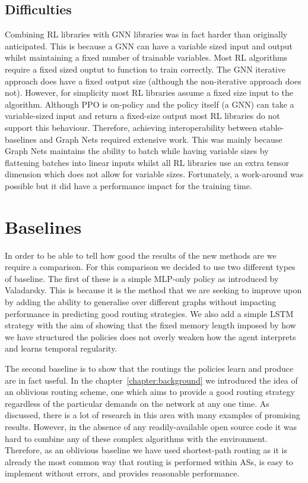 \subsection{Difficulties}
Combining RL libraries with GNN libraries was in fact harder than originally anticipated. This is because a GNN can have a variable sized input and output whilst maintaining a fixed number of trainable variables. Most RL algorithms require a fixed sized ouptut to function to train correctly. The GNN iterative approach does have a fixed output size (although the non-iterative approach does not). However, for simplicity most RL libraries assume a fixed size input to the algorithm. Although PPO is on-policy and the policy itself (a GNN) can take a variable-sized input and return a fixed-size output most RL libraries do not support this behaviour. Therefore, achieving interoperability between stable-baselines and Graph Nets required extensive work. This was mainly because Graph Nets maintains the ability to batch while having variable sizes by flattening batches into linear inputs whilst all RL libraries use an extra tensor dimension which does not allow for variable sizes. Fortunately, a work-around was possible but it did have a performance impact for the training time.


\section{Baselines}
In order to be able to tell how good the results of the new methods are we require a comparison. For this comparison we decided to use two different types of baseline. The first of these is a simple MLP-only policy as introduced by Valadarsky. This is because it is the method that we are seeking to improve upon by adding the ability to generalise over different graphs without impacting performance in predicting good routing strategies. We also add a simple LSTM strategy with the aim of showing that the fixed memory length imposed by how we have structured the policies does not overly weaken how the agent interprets and learns temporal regularity.

The second baseline is to show that the routings the policies learn and produce are in fact useful. In the chapter~\ref{chapter:background} we introduced the idea of an oblivious routing scheme, one which aims to provide a good routing strategy regardless of the particular demands on the network at any one time. As discussed, there is a lot of research in this area with many examples of promising results. However, in the absence of any readily-available open source code it was hard to combine any of these complex algorithms with the environment. Therefore, as an oblivious baseline we have used shortest-path routing as it is already the most common way that routing is performed within ASs, is easy to implement without errors, and provides reasonable performance.

